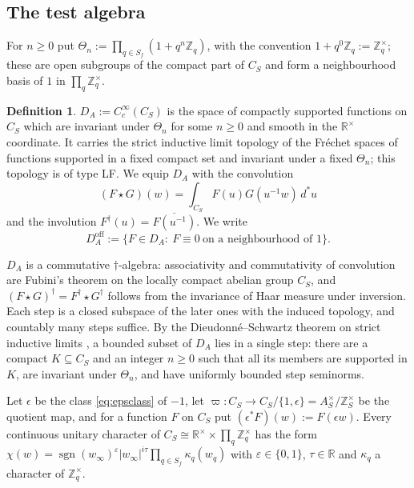\documentclass[11pt]{amsart}
\theoremstyle{definition}
\newtheorem{definition}[theorem]{Definition}
\theoremstyle{remark}
\newcommand{\R}{\mathbb R}
\newcommand{\Z}{\mathbb Z}
\newcommand{\dstar}{\,d^{*}}
\newcommand{\sgn}{\operatorname{sgn}}
\newcommand{\DA}{D_A}
\begin{document}
\subsection{The test algebra}

For $n\ge0$ put $\Theta_n:=\prod_{q\in S_f}(1+q^{n}\Z_q)$, with the convention
$1+q^{0}\Z_q:=\Z_q^{\times}$; these are open subgroups of the compact part of
$C_S$ and form a neighbourhood basis of $1$ in $\prod_q\Z_q^{\times}$.

\begin{definition}\label{def:DA}
$\DA:=C_c^{\infty}(C_S)$ is the space of compactly supported functions on
$C_S$ which are invariant under $\Theta_n$ for some $n\ge0$ and smooth in
the $\R^{\times}$ coordinate.  It carries the
strict inductive limit topology of the Fr\'echet spaces of functions supported
in a fixed compact set and invariant under a fixed $\Theta_n$; this topology
is of type LF.  We equip $\DA$ with the convolution
\[
(F\star G)(w)=\int_{C_S}F(u)G(u^{-1}w)\dstar u
\]
and the involution $F^{\dagger}(u)=\overline{F(u^{-1})}$.  We write
\[
\DA^{\mathrm{off}}:=\{F\in\DA:\ F\equiv0\ \text{on a neighbourhood of }1\}.
\]
\end{definition}

$\DA$ is a commutative $\dagger$-algebra: associativity and commutativity of
convolution are Fubini's theorem on the locally compact abelian group $C_S$,
and $(F\star G)^{\dagger}=F^{\dagger}\star G^{\dagger}$ follows from the
invariance of Haar measure under inversion.  Each step is a closed subspace of
the later ones with the induced topology, and countably many steps suffice.
By the Dieudonn\'e--Schwartz theorem on strict inductive limits
\cite[Ch.~II, 6.5]{Schaefer}, a bounded subset of $\DA$ lies in a single step: there are a compact
$K\subseteq C_S$ and an integer $n\ge0$ such that all its members are supported
in $K$, are invariant under $\Theta_n$, and have uniformly bounded step
seminorms.

Let $\epsilon$ be the class \eqref{eq:epsclass} of $-1$, let
$\varpi:C_S\to C_S/\{1,\epsilon\}=A_S^{\times}/\Z_S^{\times}$ be the
quotient map, and for a function $F$ on $C_S$ put
$(\epsilon^{*}F)(w):=F(\epsilon w)$.  Every continuous unitary character of
$C_S\cong\R^{\times}\times\prod_q\Z_q^{\times}$ has the form
$\chi(w)=\sgn(w_{\infty})^{\varepsilon}|w_{\infty}|^{i\tau}
\prod_{q\in S_f}\kappa_q(w_q)$ with $\varepsilon\in\{0,1\}$, $\tau\in\R$ and
$\kappa_q$ a character of $\Z_q^{\times}$.
\end{document}
